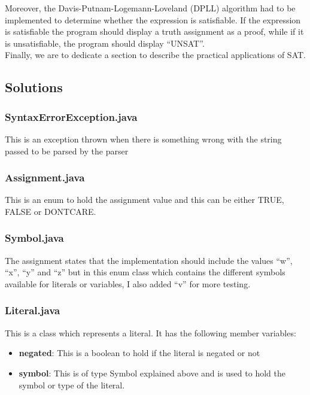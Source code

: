 \documentclass{article}
\newcommand{\quotes}[1]{``#1''}
\begin{document}
				\noindent Moreover, the Davis-Putnam-Logemann-Loveland (DPLL) algorithm had to be implemented to determine whether the expression is satisfiable. If the expression is satisfiable the program should display a truth assignment as a proof, while if it is unsatisfiable, the program should display \quotes{UNSAT}.\\
				
\noindent Finally, we are to dedicate a section to describe the practical applications of SAT. 

		\subsection{Solutions}
		
		\subsubsection{SyntaxErrorException.java}
		
		This is an exception thrown when there is something wrong with the string passed to be parsed by the parser
		
		
		\subsubsection{Assignment.java}
		
		This is an enum to hold the assignment value and this can be either TRUE, FALSE or DONTCARE.
		
		\subsubsection{Symbol.java}
		
		The assignment states that the implementation should include the values  \quotes{w}, \quotes{x}, \quotes{y} and \quotes{z} but in this enum class which contains the different symbols available for literals or variables, I also added  \quotes{v} for more testing.
		
		\subsubsection{Literal.java}
		
		This is a class which represents a literal. It has the following member variables:
		\begin{itemize}
		\item \textbf{negated}: This is a boolean to hold if the literal is negated or not
		\item \textbf{symbol}: This is of type Symbol explained above and is used to hold the symbol or type of the literal.
		\end{itemize}
		
\end{document}
